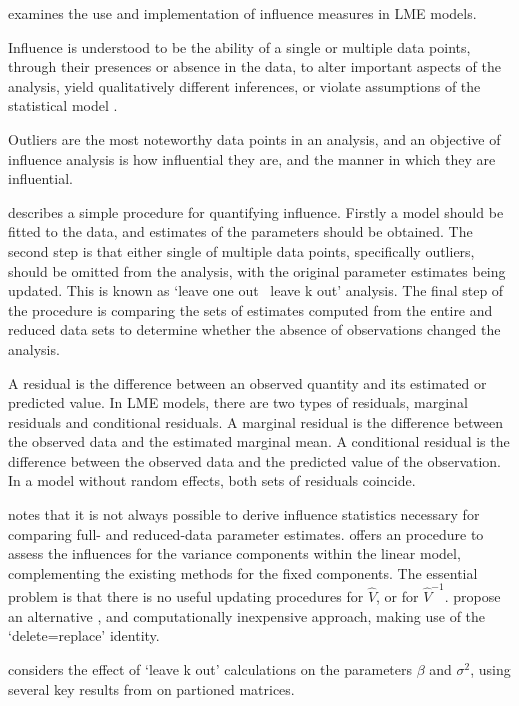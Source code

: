 \documentclass[MAIN.tex]{subfiles}
\begin{document}
\citet{schabenberger} examines the use and implementation of
influence measures in LME models.

Influence is understood to be the ability of a single or multiple
data points, through their presences or absence in the data, to
alter important aspects of the analysis, yield qualitatively
different inferences, or violate assumptions of the statistical
model \citep{schabenberger}.

Outliers are the most noteworthy data points in an analysis, and
an objective of influence analysis is how influential they are,
and the manner in which they are influential.

\citet{schabenberger} describes a simple procedure for quantifying
influence. Firstly a model should be fitted to the data, and
estimates of the parameters should be obtained. The second step is
that either single of multiple data points, specifically outliers,
should be omitted from the analysis, with the original parameter
estimates being updated. This is known as `leave one out \ leave k
out' analysis. The final step of the procedure is comparing the
sets of estimates computed from the entire and reduced data sets
to determine whether the absence of observations changed the
analysis.



A residual is the difference between an observed quantity and its
estimated or predicted value. In LME models, there are two types
of residuals, marginal residuals and conditional residuals. A
marginal residual is the difference between the observed data and
the estimated marginal mean. A conditional residual is the
difference between the observed data and the predicted value of
the observation. In a model without random effects, both sets of
residuals coincide.

\citet{schabenberger} notes that it is not always possible to
derive influence statistics necessary for comparing full- and
reduced-data parameter estimates. \citet{HaslettDillane} offers an
procedure to assess the influences for the variance components
within the linear model, complementing the existing methods for
the fixed components. The essential problem is that there is no
useful updating procedures for $\hat{V}$, or for $\hat{V}^{-1}$.
\citet{HaslettDillane} propose an alternative , and
computationally inexpensive approach, making use of the
`delete=replace' identity.

\citet{Haslett99} considers the effect of `leave k out'
calculations on the parameters $\beta$ and $\sigma^{2}$, using
several key results from \citet{HaslettHayes} on partioned
matrices.
\end{document}
